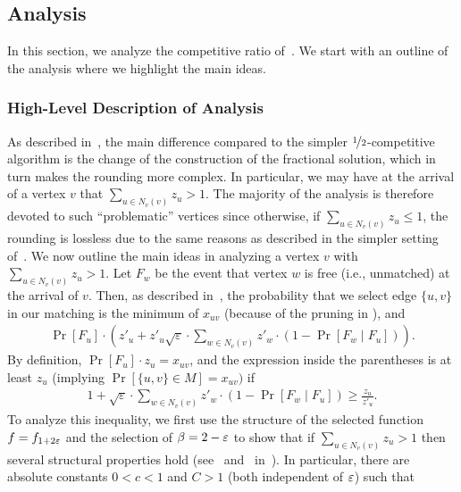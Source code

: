 \subsection{Analysis}\label{sec:analysis}
\newcommand{\EventEQ}[1]{\ensuremath{\mathrm{EQ}_{#1}}}
\newcommand{\EventIN}[1]{\ensuremath{\mathrm{IN}_{#1}}}


In this section, we analyze the competitive ratio of~. We start with an outline of the analysis where we highlight the main ideas.

\subsubsection{High-Level Description of Analysis}
As described in~, the main difference compared to the simpler $\nicefrac{1}{2}$-competitive algorithm is the change of the construction of the fractional solution, which in turn makes the rounding more complex. In particular, we may have at the arrival of a vertex $v$ that $\sum_{u\in N_v(v)} z_u > 1$.  The majority of the analysis is therefore devoted to such ``problematic'' vertices since otherwise, if $\sum_{u\in N_v(v)} z_u \leq 1$, the rounding is lossless due to the same reasons as described in the simpler setting of~. We now outline the main ideas in analyzing a vertex $v$ with $\sum_{u\in N_v(v)} z_u > 1$. Let $F_w$ be the event that vertex $w$ is free (i.e., unmatched) at the arrival of $v$. Then, as described in~, the probability that we select edge $\{u,v\}$ in our matching is the minimum of $x_{uv}$  (because of the pruning in ), and
\begin{align*}
\Pr[F_u] \cdot \left(z'_{u} + z'_u \sqrt{\varepsilon} \cdot \sum_{w\in N_v(v)} z'_w \cdot (1-\Pr[F_w \mid F_u])  \right).
\end{align*}
 By definition, $\Pr[F_u] \cdot z_u = x_{uv}$, and the expression inside the parentheses is at least $z_u$ (implying $\Pr[\{u,v\}\in M]= x_{uv})$ if
\begin{align}
1 + \sqrt{\varepsilon} \cdot \sum_{w\in N_v(v)} z'_w \cdot (1-\Pr[F_w \mid F_u])  \geq \frac{z_u}{z'_{u}}.
\label{eq:enough}
\end{align}
To analyze this inequality, we first use the structure of the selected function
$f= f_{1+2\varepsilon}$ and the selection of $\beta = 2-\varepsilon$ to show that if $\sum_{u\in
N_v(v)} z_u > 1$ then several structural properties hold (see~ and~ in~). In particular, there are absolute constants $0<c<1$ and $C>1$ (both independent of $\varepsilon$) such that 
